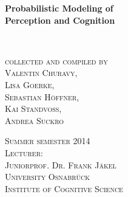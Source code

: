 \documentclass[../main/Notes.tex]{subfiles}
\begin{document}
\begin{center}


\vspace*{2cm}

\Large
\textbf{Probabilistic Modeling of \\Perception and Cognition}\\

\vspace{1cm}

\normalsize
\textbf{
\iftoggle{solutions}{Lecture Notes and Exercise Solutions}{Lecture Notes}
}\\

\vspace{3cm}

\textsc{collected and compiled by\\
Valentin Churavy,\\
Lisa Goerke,\\
Sebastian Höffner,\\
Kai Standvoss,\\
Andrea Suckro}

\vspace{6cm}

\textsc{Summer semester 2014}\\
\vspace{1cm}
\textsc{Lecturer:\\
Juniorprof. Dr. Frank Jäkel}\\
\vspace{0.5cm}
\textsc{University Osnabrück\\
Institute of Cognitive Science}\\


\end{center}
\end{document}
